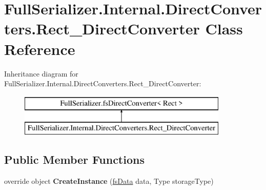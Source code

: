 \hypertarget{class_full_serializer_1_1_internal_1_1_direct_converters_1_1_rect___direct_converter}{}\section{Full\+Serializer.\+Internal.\+Direct\+Converters.\+Rect\+\_\+\+Direct\+Converter Class Reference}
\label{class_full_serializer_1_1_internal_1_1_direct_converters_1_1_rect___direct_converter}
Inheritance diagram for Full\+Serializer.\+Internal.\+Direct\+Converters.\+Rect\+\_\+\+Direct\+Converter\+:\begin{figure}[H]
\begin{center}
\leavevmode
\includegraphics[height=2.000000cm]{class_full_serializer_1_1_internal_1_1_direct_converters_1_1_rect___direct_converter}
\end{center}
\end{figure}
\subsection*{Public Member Functions}
\begin{DoxyCompactItemize}
\item 
\mbox{\label{class_full_serializer_1_1_internal_1_1_direct_converters_1_1_rect___direct_converter_ae48648354077452a90727bbaa8915172}} 
override object {\bfseries Create\+Instance} (\hyperlink{class_full_serializer_1_1fs_data}{fs\+Data} data, Type storage\+Type)
\end{DoxyCompactItemize}
